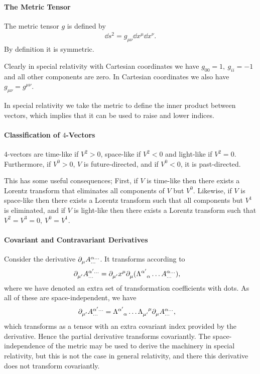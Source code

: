 \paragraph{The Metric Tensor}
The metric tensor $g$ is defined by
\begin{align*}
	\dd{s}^{2} = g_{\mu\nu}\dd{x^{\mu}}\dd{x^{\nu}}.
\end{align*}
By definition it is symmetric.

Clearly in special relativity with Cartesian coordinates we have $g_{00} = 1,\ g_{ii} = -1$ and all other components are zero. In Cartesian coordinates we also have $g_{\mu\nu} = g^{\mu\nu}$.

In special relativity we take the metric to define the inner product between vectors, which implies that it can be used to raise and lower indices.

\paragraph{Classification of $4$-Vectors}
$4$-vectors are time-like if $V^{2} > 0$, space-like if $V^{2} < 0$ and light-like if $V^{2} = 0$. Furthermore, if $V^{0} > 0$, $V$ is future-directed, and if $V^{0} < 0$, it is past-directed.

This has some useful consequences; First, if $V$ is time-like then there exists a Lorentz transform that eliminates all components of $V$ but $V^{0}$. Likewise, if $V$ is space-like then there exists a Lorentz transform such that all components but $V^{1}$ is eliminated, and if $V$ is light-like then there exists a Lorentz transform such that $V^{2} = V^{3} = 0,\ V^{0} = V^{1}$.

\paragraph{Covariant and Contravariant Derivatives}
Consider the derivative $\del{\mu}{\tensor*{A}{^{\alpha\dots}_{\dots}}}$. It transforms according to
\begin{align*}
	\del{\mu\p}{\tensor*{A}{^{\alpha\p\dots}_{\dots}}} &= \del{\mu\p}{x^{\mu}}\del{\mu}{(\trcou{\alpha\p}{\alpha}\dots\tensor*{A}{^{\alpha\dots}_{\dots}})},
\end{align*}
where we have denoted an extra set of transformation coefficients with dots. As all of these are space-independent, we have
\begin{align*}
	\del{\mu\p}{\tensor*{A}{^{\alpha\p\dots}_{\dots}}} &= \trcou{\alpha\p}{\alpha}\dots\trcod{\mu\p}{\mu}\del{\mu}{\tensor*{A}{^{\alpha\dots}_{\dots}}},
\end{align*}
which transforms as a tensor with an extra covariant index provided by the derivative. Hence the partial derivative transforms covariantly. The space-independence of the metric may be used to derive the machinery in special relativity, but this is not the case in general relativity, and there this derivative does not transform covariantly.

